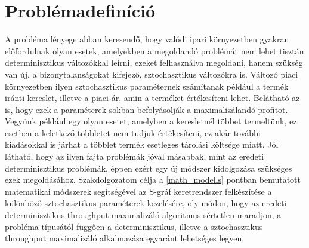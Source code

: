 \chapter{Problémadefiníció} \label{Problem_def}
A probléma lényege abban keresendő, hogy valódi ipari környezetben gyakran előfordulnak olyan esetek, amelyekben a megoldandó problémát nem lehet tisztán determinisztikus változókkal leírni, ezeket felhasználva megoldani, hanem szükség van új, a bizonytalanságokat kifejező, sztochasztikus változókra is.
Változó piaci környezetben ilyen sztochasztikus paraméternek számítanak például a termék iránti kereslet, illetve a piaci ár, amin a terméket értékesíteni lehet.
Belátható az is, hogy ezek a paraméterek sokban befolyásolják a maximalizálandó profitot.
Vegyünk például egy olyan esetet, amelyben a keresletnél többet termeltünk, ez esetben a keletkező többletet nem tudjuk értékesíteni, ez akár további kiadásokkal is járhat a többlet termék esetleges tárolási költsége miatt.
Jól látható, hogy az ilyen fajta problémák jóval másabbak, mint az eredeti determinisztikus problémák, éppen ezért egy új módszer kidolgozása szükséges ezek megoldásához.
Szakdolgozatom célja a \ref{math_modells} pontban bemutatott matematikai módszerek segítségével az S-gráf keretrendszer felkészítése a különböző sztochasztikus paraméterek kezelésére, oly módon, hogy az eredeti determinisztikus throughput maximalizáló algoritmus sértetlen maradjon, a probléma típusától függően a determinisztikus, illetve a sztochasztikus throughput maximalizáló alkalmazása egyaránt lehetséges legyen.
